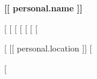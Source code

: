 \documentclass[a4paper,10pt]{article}
\begin{document}
\begin{center}
    {\Huge\bfseries\color{primary} [[ personal.name ]]}
    
    \vspace{6pt}
    
    {\large
    [%
    [%
    [%
    [%
    [%
    [%
    [%
    }
    
    [%
    \vspace{3pt}
    {\normalsize\color{gray} [[ personal.location ]]}
    [%
\end{center}

\vspace{8pt}

[%
\end{document}
